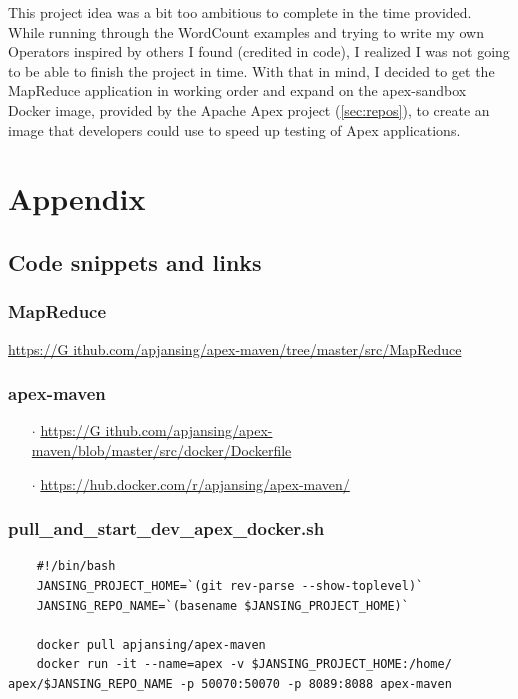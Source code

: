 \documentclass[final]{IEEEtran}
\begin{document}
This project idea was a bit too ambitious to complete in the time provided. While running through the WordCount examples and trying to write my own Operators inspired by others I found (credited in code), I realized I was not going to be able to finish the project in time. With that in mind, I decided to get the MapReduce application in working order and expand on the apex-sandbox Docker image, provided by the Apache Apex project (\ref{sec:repos}), to create an image that developers could use to speed up testing of Apex applications.

\newpage
\section{Appendix}

\subsection{Code snippets and links}
  \subsubsection{MapReduce}\label{sec:map-reduce}
  \url{https://G
ithub.com/apjansing/apex-maven/tree/master/src/MapReduce}

  \subsubsection{apex-maven}\label{sec:apex-maven}
  \begin{enumerate}
    \item[$\cdot$] \url{https://G
  ithub.com/apjansing/apex-maven/blob/master/src/docker/Dockerfile}
    \item[$\cdot$] \url{https://hub.docker.com/r/apjansing/apex-maven/}
  \end{enumerate}
  
  \subsubsection{pull\_and\_start\_dev\_apex\_docker.sh}\label{sec:start-script}
  \begin{lstlisting}
    #!/bin/bash
    JANSING_PROJECT_HOME=`(git rev-parse --show-toplevel)`
    JANSING_REPO_NAME=`(basename $JANSING_PROJECT_HOME)`
    
    docker pull apjansing/apex-maven
    docker run -it --name=apex -v $JANSING_PROJECT_HOME:/home/ apex/$JANSING_REPO_NAME -p 50070:50070 -p 8089:8088 apex-maven
  \end{lstlisting}
  
\end{document}
